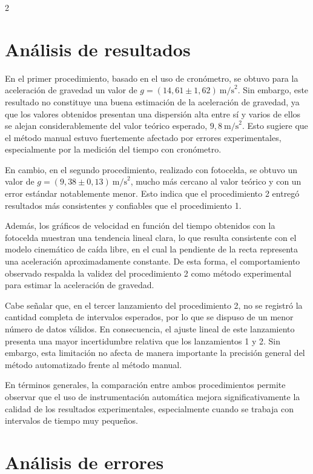 \documentclass[11pt,letterpaper]{article}
\begin{document}
\begin{multicols}{2}
\section{Análisis de resultados}

En el primer procedimiento, basado en el uso de cronómetro, se obtuvo para la aceleración de gravedad un valor de $g=(14,61 \pm 1,62)\ \text{m/s}^2$. Sin embargo, este resultado no constituye una buena estimación de la aceleración de gravedad, ya que los valores obtenidos presentan una dispersión alta entre sí y varios de ellos se alejan considerablemente del valor teórico esperado, $9,8\ \text{m/s}^2$. Esto sugiere que el método manual estuvo fuertemente afectado por errores experimentales, especialmente por la medición del tiempo con cronómetro.

En cambio, en el segundo procedimiento, realizado con fotocelda, se obtuvo un valor de $g=(9,38 \pm 0,13)\ \text{m/s}^2$, mucho más cercano al valor teórico y con un error estándar notablemente menor. Esto indica que el procedimiento 2 entregó resultados más consistentes y confiables que el procedimiento 1.

Además, los gráficos de velocidad en función del tiempo obtenidos con la fotocelda muestran una tendencia lineal clara, lo que resulta consistente con el modelo cinemático de caída libre, en el cual la pendiente de la recta representa una aceleración aproximadamente constante. De esta forma, el comportamiento observado respalda la validez del procedimiento 2 como método experimental para estimar la aceleración de gravedad.

Cabe señalar que, en el tercer lanzamiento del procedimiento 2, no se registró la cantidad completa de intervalos esperados, por lo que se dispuso de un menor número de datos válidos. En consecuencia, el ajuste lineal de este lanzamiento presenta una mayor incertidumbre relativa que los lanzamientos 1 y 2. Sin embargo, esta limitación no afecta de manera importante la precisión general del método automatizado frente al método manual.

En términos generales, la comparación entre ambos procedimientos permite observar que el uso de instrumentación automática mejora significativamente la calidad de los resultados experimentales, especialmente cuando se trabaja con intervalos de tiempo muy pequeños.

\section{Análisis de errores}


\end{multicols}
\end{document}
